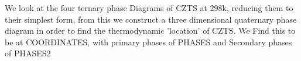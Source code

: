We look at the four ternary phase Diagrams of CZTS at 298k, reducing them to their simplest form, from this we construct a three dimensional quaternary phase diagram in order to find the thermodynamic 'location' of CZTS. We Find this to be at COORDINATES, with primary phases of PHASES and Secondary phases of PHASES2
